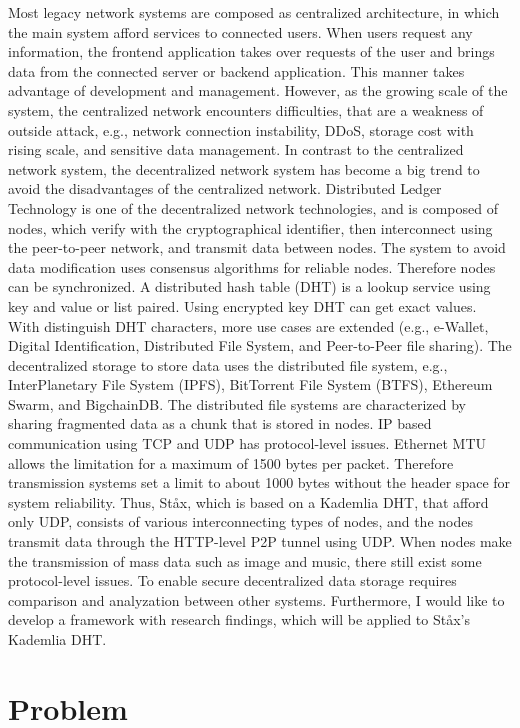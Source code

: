 Most legacy network systems are composed as centralized architecture, in which the main system afford services to connected users. When users request any information, the frontend application takes over requests of the user and brings data from the connected server or backend application. This manner takes advantage of development and management. However, as the growing scale of the system, the centralized network encounters difficulties, that are a weakness of outside attack, e.g., network connection instability, DDoS, storage cost with rising scale, and sensitive data management. In contrast to the centralized network system, the decentralized network system has become a big trend to avoid the disadvantages of the centralized network. Distributed Ledger Technology is one of the decentralized network technologies, and is composed of nodes, which verify with the cryptographical identifier, then interconnect using the peer-to-peer network, and transmit data between nodes. The system to avoid data modification uses consensus algorithms for reliable nodes. Therefore nodes can be synchronized. A distributed hash table (DHT) is a lookup service using key and value or list paired. Using encrypted key DHT can get exact values. With distinguish DHT characters, more use cases are extended (e.g., e-Wallet, Digital Identification, Distributed File System, and Peer-to-Peer file sharing). The decentralized storage to store data uses the distributed file system, e.g., InterPlanetary File System (IPFS), BitTorrent File System (BTFS), Ethereum Swarm, and BigchainDB. The distributed file systems are characterized by sharing fragmented data as a chunk that is stored in nodes. IP based communication using TCP and UDP has protocol-level issues. Ethernet MTU allows the limitation for a maximum of 1500 bytes per packet. Therefore transmission systems set a limit to about 1000 bytes without the header space for system reliability. Thus, St\aa x, which is based on a Kademlia DHT, that afford only UDP, consists of various interconnecting types of nodes, and the nodes transmit data through the HTTP-level P2P tunnel using UDP. When nodes make the transmission of mass data such as image and music, there still exist some protocol-level issues. To enable secure decentralized data storage requires comparison and analyzation between other systems. Furthermore, I would like to develop a framework with research findings, which will be applied to St\aa x's Kademlia DHT.

\section{Problem}

